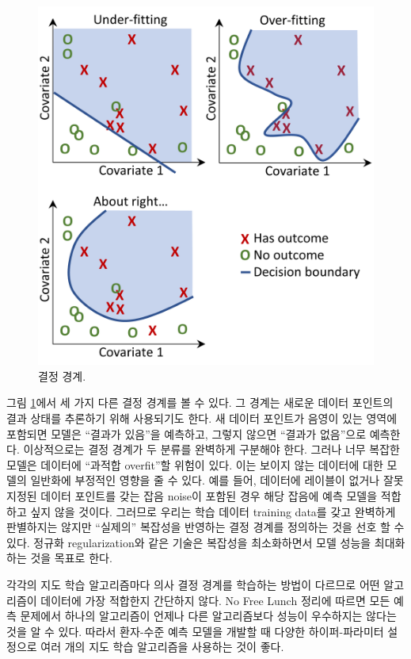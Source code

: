 \documentclass[10.5pt]{book}
\theoremstyle{definition}
\theoremstyle{definition}
\theoremstyle{definition}
\theoremstyle{remark}
\begin{document}
\begin{figure}

{\centering \includegraphics[width=0.8\linewidth]{images/PatientLevelPrediction/decisionBoundary} 

}

\caption{결정 경계.}\label{fig:decisionBoundary}
\end{figure}

그림 \ref{fig:decisionBoundary}에서 세 가지 다른 결정 경계를 볼 수 있다.
그 경계는 새로운 데이터 포인트의 결과 상태를 추론하기 위해 사용되기도
한다. 새 데이터 포인트가 음영이 있는 영역에 포함되면 모델은 ``결과가
있음''을 예측하고, 그렇지 않으면 ``결과가 없음''으로 예측한다.
이상적으로는 결정 경계가 두 분류를 완벽하게 구분해야 한다. 그러나 너무
복잡한 모델은 데이터에 ``과적합 overfit''할 위험이 있다. 이는 보이지
않는 데이터에 대한 모델의 일반화에 부정적인 영향을 줄 수 있다. 예를
들어, 데이터에 레이블이 없거나 잘못 지정된 데이터 포인트를 갖는 잡음
noise이 포함된 경우 해당 잡음에 예측 모델을 적합하고 싶지 않을 것이다.
그러므로 우리는 학습 데이터 training data를 갖고 완벽하게 판별하지는
않지만 ``실제의'' 복잡성을 반영하는 결정 경계를 정의하는 것을 선호 할 수
있다. 정규화 regularization와 같은 기술은 복잡성을 최소화하면서 모델
성능을 최대화하는 것을 목표로 한다.

각각의 지도 학습 알고리즘마다 의사 결정 경계를 학습하는 방법이 다르므로
어떤 알고리즘이 데이터에 가장 적합한지 간단하지 않다. No Free Lunch
정리에 따르면 모든 예측 문제에서 하나의 알고리즘이 언제나 다른
알고리즘보다 성능이 우수하지는 않다는 것을 알 수
있다. 따라서 환자-수준 예측 모델을 개발할 때 다양한
하이퍼-파라미터 설정으로 여러 개의 지도 학습 알고리즘을 사용하는 것이
좋다.
\end{document}
